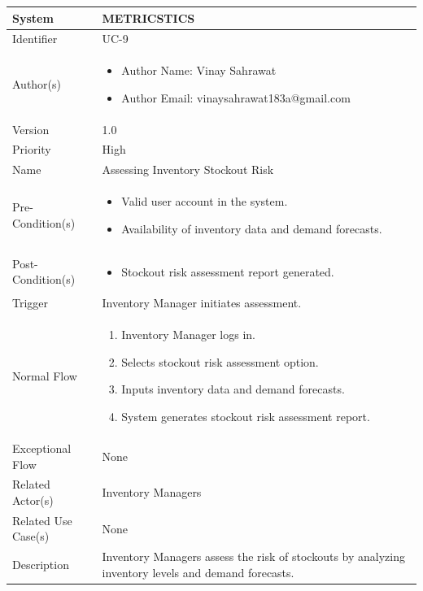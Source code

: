 \begin{center}
	\begin{tabularx}{\textwidth}{|l|X|}
		\hline
		System & METRICSTICS \\
		\hline
		Identifier & UC-9 \\
		\hline
		Author(s) & \begin{itemize}[left=0pt]
			\item Author Name: Vinay Sahrawat
			\item Author Email: vinaysahrawat183a@gmail.com
		\end{itemize} \\
		\hline
		Version & 1.0 \\
		\hline
		Priority & High \\
		\hline
		Name & Assessing Inventory Stockout Risk \\
		\hline
		Pre-Condition(s) &  \begin{itemize}[left=0pt]
			\item Valid user account in the system.
			\item Availability of inventory data and demand forecasts.
		\end{itemize} \\
		\hline
		Post-Condition(s) & \begin{itemize}[left=0pt]
			\item Stockout risk assessment report generated.
		\end{itemize} \\
		\hline
		Trigger & Inventory Manager initiates assessment. \\
		\hline
		Normal Flow & \begin{enumerate}[left=0pt]
			\item Inventory Manager logs in.
			\item Selects stockout risk assessment option.
			\item Inputs inventory data and demand forecasts.
			\item System generates stockout risk assessment report.
		\end{enumerate} \\
		\hline
		Exceptional Flow & None \\
		\hline
		Related Actor(s) & Inventory Managers \\
		\hline
		Related Use Case(s) & None \\
		\hline
		Description & Inventory Managers assess the risk of stockouts by analyzing inventory levels and demand forecasts. \\
		\hline
	\end{tabularx}
\end{center}

